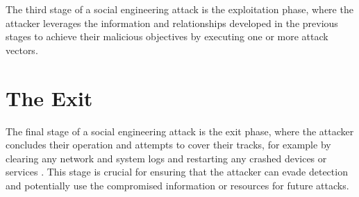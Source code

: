 The third stage of a social engineering attack is the exploitation phase, where the attacker leverages the information and relationships developed in the previous stages to achieve their malicious objectives by executing one or more attack vectors.





\section{The Exit}
\begin{comment}
    
    - Not burning any bridges
    - Using the built relationships for future SE attacks
    - "Always leave them better off for having met you" also serves the purpose of using built relationships in the future again

\end{comment}

The final stage of a social engineering attack is the exit phase, where the attacker concludes their operation and attempts to cover their tracks, for example by clearing any network and system logs and restarting any crashed devices or services \citep{mitnickArtDeceptionControlling2003}. This stage is crucial for ensuring that the attacker can evade detection and potentially use the compromised information or resources for future attacks.








